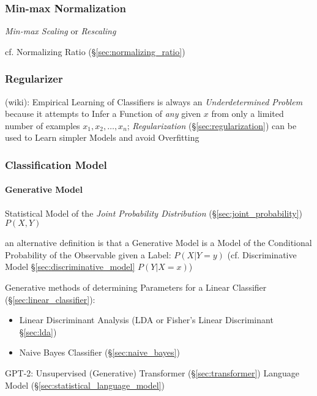 \subsubsection{Min-max Normalization}\label{sec:minmax_normalization}

\emph{Min-max Scaling} or \emph{Rescaling}

\fist cf. Normalizing Ratio (\S\ref{sec:normalizing_ratio})



\subsubsection{Regularizer}\label{sec:regularizer}

(wiki): Empirical Learning of Classifiers is always an \emph{Underdetermined
  Problem} because it attempts to Infer a Function of \emph{any} given $x$ from
only a limited number of examples $x_1, x_2, \ldots, x_n$; \emph{Regularization}
(\S\ref{sec:regularization}) can be used to Learn simpler Models and avoid
Overfitting



\subsubsection{Classification Model}\label{sec:classification_model}

\paragraph{Generative Model}\label{sec:generative_model}\hfill

Statistical Model of the \emph{Joint Probability Distribution}
(\S\ref{sec:joint_probability}) $P(X,Y)$

an alternative definition is that a Generative Model is a Model of the
Conditional Probability of the Observable given a Label: $P(X|Y = y)$
(cf. Discriminative Model \S\ref{sec:discriminative_model} $P(Y|X = x)$)

Generative methods of determining Parameters for a Linear Classifier
(\S\ref{sec:linear_classifier}):
\begin{itemize}
  \item Linear Discriminant Analysis (LDA or Fisher's Linear Discriminant
    \S\ref{sec:lda})
  \item Naive Bayes Classifier (\S\ref{sec:naive_bayes})
\end{itemize}

GPT-2: Unsupervised (Generative) Transformer (\S\ref{sec:transformer}) Language
Model (\S\ref{sec:statistical_language_model})

